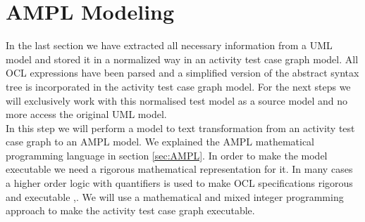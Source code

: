 \section{AMPL Modeling}
\label{sec:atcg2Ampl}
In the last section we have extracted all necessary information from a UML model and stored it in a normalized way in an activity test case graph model. All OCL expressions have been parsed and a simplified version of the abstract syntax tree is incorporated in the activity test case graph model. For the next steps we will exclusively work with this normalised test model as a source model and no more access the original UML model.\\
In this step we will perform a model to text transformation from an activity test case graph to an AMPL model. We explained the AMPL mathematical programming language in section \ref{sec:AMPL}. In order to make the model executable we need a rigorous mathematical representation for it. In many cases a higher order logic with quantifiers is used to make OCL specifications rigorous and executable \cite{krieger2008executingUnderspecifiedOCL},\cite{brucker2012theoremProverBasedTesting}. We will use a mathematical and mixed integer programming approach to make the activity test case graph executable.\\
